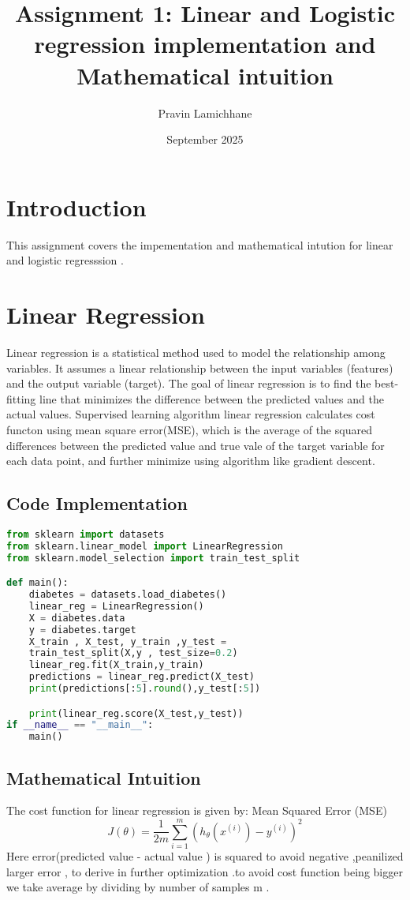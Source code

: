 \documentclass{article}
\begin{document}
\title{Assignment 1: Linear and Logistic regression implementation and Mathematical intuition}
\author{Pravin Lamichhane}
\date{September 2025}
\maketitle
\section{Introduction}
This assignment covers the impementation and mathematical intution for linear and logistic regresssion .
\section{Linear Regression}
Linear regression is a statistical method used to model the relationship among variables. It assumes a linear relationship between the input variables (features) and the output variable (target). The goal of linear regression is to find the best-fitting line that minimizes the difference between the predicted values and the actual values.
Supervised learning algorithm linear regression calculates cost functon using mean square error(MSE), which is the average of the squared differences between the predicted value and true vale of the target variable for each data point, and further minimize using algorithm like gradient descent.
\subsection{Code Implementation}
\begin{lstlisting}[language=Python]
from sklearn import datasets
from sklearn.linear_model import LinearRegression
from sklearn.model_selection import train_test_split

def main():
    diabetes = datasets.load_diabetes()
    linear_reg = LinearRegression()
    X = diabetes.data
    y = diabetes.target
    X_train , X_test, y_train ,y_test = 
    train_test_split(X,y , test_size=0.2)
    linear_reg.fit(X_train,y_train)
    predictions = linear_reg.predict(X_test)
    print(predictions[:5].round(),y_test[:5]) 

    print(linear_reg.score(X_test,y_test))
if __name__ == "__main__":
    main()
\end{lstlisting}
\subsection{Mathematical Intuition}
The cost function for linear regression is given by: Mean Squared Error (MSE)
\begin{equation}
J(\theta) = \frac{1}{2m} \sum_{i=1}^{m} (h_\theta(x^{(i)}) - y^{(i)})^2
\end{equation}
Here error(predicted value - actual value ) is squared to avoid negative ,peanilized larger error , to derive in further optimization .to avoid cost function being bigger we take average by dividing by number of samples m .
\end{document}
